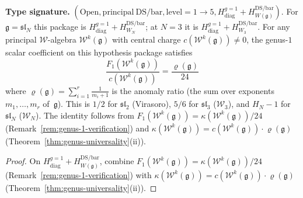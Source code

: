 \begin{corollary}
\label{cor:genus1-anomaly-ratio}
\textbf{Type signature.}
$(\mathrm{Open},\mathrm{principal\ DS/bar},\mathrm{level}=1\to5,
H_{\mathrm{diag}}^{g=1}+H_{W(\mathfrak g)}^{\mathrm{DS/bar}})$.
For $\mathfrak g=\mathfrak{sl}_N$ this package is
$H_{\mathrm{diag}}^{g=1}+H_{W_N}^{\mathrm{DS/bar}}$; at $N=3$ it is
$H_{\mathrm{diag}}^{g=1}+H_{W_3}^{\mathrm{DS/bar}}$.
For any principal $\mathcal{W}$-algebra
$\mathcal{W}^k(\mathfrak{g})$ with
central charge $c(\mathcal{W}^k(\mathfrak{g})) \neq 0$, the genus-$1$
scalar coefficient on this hypothesis package satisfies
\begin{equation}\label{eq:F1-over-c}
\frac{F_1(\mathcal{W}^k(\mathfrak{g}))}
 {c(\mathcal{W}^k(\mathfrak{g}))}
 = \frac{\varrho(\mathfrak{g})}{24}
\end{equation}
where $\varrho(\mathfrak{g}) = \sum_{i=1}^r \frac{1}{m_i+1}$ is the anomaly ratio (the sum over exponents $m_1, \ldots, m_r$ of~$\mathfrak{g}$). This is $1/2$ for $\mathfrak{sl}_2$ (Virasoro), $5/6$ for $\mathfrak{sl}_3$ ($\mathcal{W}_3$), and $H_N - 1$ for $\mathfrak{sl}_N$ ($\mathcal{W}_N$). The identity follows from
$F_1(\mathcal W^k(\mathfrak{g}))=\kappa(\mathcal W^k(\mathfrak{g}))/24$
(Remark~\ref{rem:genus-1-verification}) and
$\kappa(\mathcal W^k(\mathfrak{g}))
 = c(\mathcal W^k(\mathfrak{g})) \cdot \varrho(\mathfrak{g})$
(Theorem~\ref{thm:genus-universality}\textup{(ii)}).
\end{corollary}

\begin{proof}
On
$H_{\mathrm{diag}}^{g=1}+H_{W(\mathfrak g)}^{\mathrm{DS/bar}}$,
combine
$F_1(\mathcal W^k(\mathfrak{g}))=\kappa(\mathcal W^k(\mathfrak{g}))/24$
(Remark~\ref{rem:genus-1-verification}) with
$\kappa(\mathcal W^k(\mathfrak{g}))
 = c(\mathcal W^k(\mathfrak{g})) \cdot \varrho(\mathfrak{g})$
(Theorem~\ref{thm:genus-universality}(ii)).
\end{proof}


